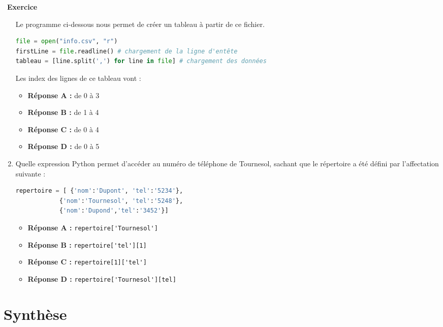 \documentclass[
  11pt,
]{article}
\newcommand{\passthrough}[1]{#1}
\providecommand{\tightlist}{%
  \setlength{\itemsep}{0pt}\setlength{\parskip}{0pt}}
\newcounter{exo}
\newenvironment{exercice}[1]
{\par \medskip   \addtocounter{exo}{1} \noindent  
\begin{bclogo}[arrondi =0.1,   noborder = true, logo=\bccrayon, marge=4]{~\textbf{Exercice} \textbf{\theexo} {\itshape #1} }  \par}
{
\end{bclogo}
 \par \bigskip }
\newcounter{prog}
\begin{document}
\begin{exercice}{}
\begin{enumerate}
  Le programme ci-dessous nous permet de créer un tableau à partir de ce
  fichier.

\begin{lstlisting}[language=Python]
file = open("info.csv", "r")
firstLine = file.readline() # chargement de la ligne d'entête
tableau = [line.split(',') for line in file] # chargement des données
\end{lstlisting}

  Les index des lignes de ce tableau vont :

  \begin{itemize}
  \tightlist
  \item
    \textbf{Réponse A :} de 0 à 3
  \item
    \textbf{Réponse B :} de 1 à 4
  \item
    \textbf{Réponse C :} de 0 à 4
  \item
    \textbf{Réponse D :} de 0 à 5
  \end{itemize}
\item
  Quelle expression Python permet d'accéder au numéro de téléphone de
  Tournesol, sachant que le répertoire a été défini par l'affectation
  suivante :

\begin{lstlisting}[language=Python]
repertoire = [ {'nom':'Dupont', 'tel':'5234'},
            {'nom':'Tournesol', 'tel':'5248'}, 
            {'nom':'Dupond','tel':'3452'}]
\end{lstlisting}

  \begin{itemize}
  \tightlist
  \item
    \textbf{Réponse A :}
    \passthrough{\lstinline!repertoire['Tournesol']!}
  \item
    \textbf{Réponse B :} \passthrough{\lstinline!repertoire['tel'][1]!}
  \item
    \textbf{Réponse C :} \passthrough{\lstinline!repertoire[1]['tel']!}
  \item
    \textbf{Réponse D :}
    \passthrough{\lstinline!repertoire['Tournesol'][tel]!}
  \end{itemize}
\end{enumerate}

\end{exercice}

\hypertarget{synthuxe8se}{%
\section{Synthèse}\label{synthuxe8se}}
\end{document}
